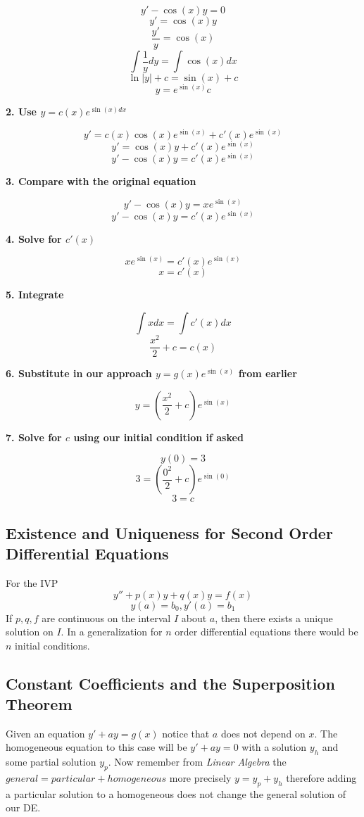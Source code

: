 \[y' -\cos(x)y = 0\]
\[y' = \cos(x)y\]
\[\frac{y'}{y} = \cos(x)\]
\[\int\frac{1}{y}dy = \int \cos(x)dx \]
\[ \ln |y|  + c= \sin(x) + c \]
\[ y = e^{\sin(x)}c \]

\textbf{2. Use \(y = c(x)e^{\sin(x)dx}\)}

\[y' = c(x)\cos(x)e^{\sin(x)} + c'(x)e^{\sin(x)}\]
\[y' = \cos(x)y + c'(x)e^{\sin(x)}\]
\[y' - \cos(x)y = c'(x)e^{\sin(x)}\]

\textbf{3. Compare with the original equation}

\[y' -\cos(x)y = x e^{\sin(x)}\]
\[y' - \cos(x)y = c'(x)e^{\sin(x)}\]

\textbf{4. Solve for \(c'(x)\)}

\[xe^{\sin(x)} = c'(x)e^{\sin(x)}\]
\[x = c'(x)\]

\textbf{5. Integrate}

\[\int x dx= \int c'(x)dx\]
\[\frac{x^2}{2} + c = c(x)\]

\textbf{6. Substitute in our approach \(y = g(x)e^{\sin(x)}\) from earlier}

\[y = \left(\frac{x^2}{2} + c\right)e^{\sin(x)}\]

\textbf{7. Solve for \(c\) using our initial condition if asked}

\[y(0) = 3\]
\[3 = \left(\frac{0^2}{2} + c\right)e^{\sin(0)}\]
\[3 = c\]


\subsection{Existence and Uniqueness for Second Order Differential Equations}

For the IVP
\[y'' + p(x)y + q(x)y = f(x)\]
\[y(a) = b_0, y'(a) = b_1\]
If \(p,q,f\) are continuous on the interval \(I\) about \(a\), then there exists a unique
solution on \(I\). In a generalization for \(n\) order differential equations there would be \(n\) 
initial conditions. 

\subsection{Constant Coefficients and the Superposition Theorem}

Given an equation \(y' + ay = g(x)\) notice that \(a\) does not depend on \(x\).
The homogeneous equation to this case will be \(y' + ay = 0\) with a solution \(y_h\) and some
partial solution \(y_p\). Now remember from \emph{Linear Algebra} the \(general = particular + homogeneous\)
more precisely \(y = y_p + y_h\) therefore adding a particular solution to a homogeneous does not change
the general solution of our DE.
\vspace{\baselineskip}


